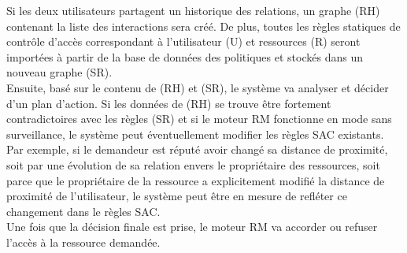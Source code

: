 Si les deux utilisateurs partagent un historique des relations, un graphe (RH) contenant la liste des interactions sera créé. De plus, toutes les règles statiques de contrôle d'accès correspondant à l'utilisateur (U) et ressources (R) seront importées à partir de la base de données des politiques et stockés dans un nouveau graphe (SR).\\


Ensuite, basé sur le contenu de (RH) et (SR), le système va analyser et décider d'un plan d'action. Si les données de (RH) se trouve être fortement contradictoires avec les règles (SR) et si le moteur RM fonctionne en mode sans surveillance, le système peut éventuellement modifier les règles SAC existants. Par exemple, si le demandeur est réputé avoir changé sa distance de proximité, soit par une évolution de sa relation envers le propriétaire des ressources, soit parce que le propriétaire de la ressource a explicitement modifié la distance de proximité de l'utilisateur, le système peut être en mesure de refléter ce changement dans le règles SAC.\\


Une fois que la décision finale est prise, le moteur RM va accorder ou refuser l'accès à la ressource demandée.


